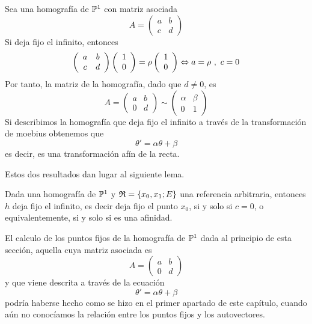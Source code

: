 Sea una homografía de $\mathbb{P}^1$ con matriz asociada
\begin{equation*}
	A=\left( \begin{array}{cc}
		a&b\\
		c&d
	\end{array}\right)
\end{equation*}
Si deja fijo el infinito, entonces
\begin{equation*}
	\left( \begin{array}{cc}
	a&b\\
	c&d
	\end{array}\right)
	\left( \begin{array}{c}
	1\\
	0
	\end{array}\right)=\rho\left( \begin{array}{c}
	1\\
	0
	\end{array}\right)\Leftrightarrow a=\rho \ , \ c=0
\end{equation*}
Por tanto, la matriz de la homografía, dado que $d\not=0$, es
\begin{equation*}
	A=\left( \begin{array}{cc}
		a&b\\
		0&d
	\end{array}\right)\sim 
	\left( \begin{array}{cc}
		\alpha&\beta\\
		0&1
	\end{array}\right)
\end{equation*}
Si describimos la homografía que deja fijo el infinito a través de la transformación de moebius obtenemos que 
\begin{equation*}
	\theta'=\alpha\theta+\beta
\end{equation*}
es decir, es una transformación afín de la recta.

Estos dos resultados dan lugar al siguiente lema.
\begin{lem}\label{C6_lem_infinito_p1_sii_afinidad}
	Dada una homografía de $\mathbb{P}^1$ y $\mathfrak{R}=\{x_0,x_1;E\}$ una referencia arbitraria, entonces $h$ deja fijo el infinito, es decir deja fijo el punto $x_0$, si y solo si $c=0$, o equivalentemente, si y solo si es una afinidad.
\end{lem}

El calculo de los puntos fijos de la homografía de $\mathbb{P}^1$ dada al principio de esta sección, aquella cuya matriz asociada es
\begin{equation*}
	A=\left( \begin{array}{cc}
		a&b\\
		0&d
	\end{array}\right)
\end{equation*}
y que viene descrita a través de la ecuación
\begin{equation*}
	\theta'=\alpha\theta+\beta
\end{equation*}
podría haberse hecho como se hizo en el primer apartado de este capítulo, cuando aún no conocíamos la relación entre los puntos fijos y los autovectores.

